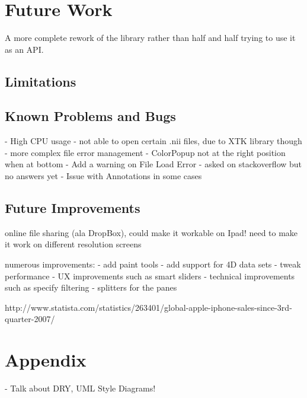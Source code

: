 \documentclass[a4paper,11pt,titlepage]{article}
\begin{document}
\section{Future Work}

A more complete rework of the library rather than half and half trying to use it as an API.

\subsection{Limitations}


\subsection{Known Problems and Bugs}

- High CPU usage
- not able to open certain .nii files, due to XTK library though
- more complex file error management
- ColorPopup not at the right position when at bottom
- Add  a warning on File Load Error - asked on stackoverflow but no answers yet
- Issue with Annotations in some cases


\subsection{Future Improvements}

online file sharing (ala DropBox), could make it workable on Ipad!
need to make it work on different resolution screens

numerous improvements:
- add paint tools
- add support for 4D data sets
- tweak performance
- UX improvements such as smart sliders
- technical improvements such as specify filtering
- splitters for the panes











\newpage

\begin{thebibliography}{1}


http://www.statista.com/statistics/263401/global-apple-iphone-sales-since-3rd-quarter-2007/

\end{thebibliography}

\newpage

\section{Appendix}



- Talk about DRY, UML Style Diagrams!
\end{document}

